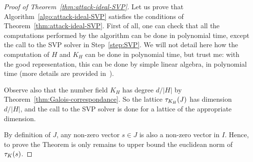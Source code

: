 \begin{proof}[Proof of Theorem~\ref{thm:attack-ideal-SVP}]
Let us prove that Algorithm~\ref{algo:attack-ideal-SVP} satisfies the conditions of Theorem~\ref{thm:attack-ideal-SVP}. First of all, one can check that all the computations performed by the algorithm can be done in polynomial time, except the call to the SVP solver in Step~\ref{step:SVP}. We will not detail here how the computation of $H$ and $K_H$ can be done in polynomial time, but trust me: with the good representation, this can be done by simple linear algebra, in polynomial time (more details are provided in~\cite{BGP22}).

Observe also that the number field $K_H$ has degree $d/|H|$ by Theorem~\ref{thm:Galois-correspondance}. So the lattice $\tau_{K_H}(J)$ has dimension $d/|H|$, and the call to the SVP solver is done for a lattice of the appropriate dimension.

By definition of $J$, any non-zero vector $s \in J$ is also a non-zero vector in $I$. Hence, to prove the Theorem is only remains to upper bound the euclidean norm of $\tau_K(s)$.


\end{proof}
